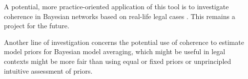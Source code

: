 \documentclass[10pt,]{scrartcl}
\begin{document}
A potential, more practice-oriented  application of this tool is to investigate coherence in  Bayesian networks based on real-life legal cases . This remains a project for the future.

Another line of investigation concerns
the potential use of coherence to    estimate model priors for Bayesian model averaging, which might be useful in legal contexts might be more fair  than using equal or fixed priors or unprincipled intuitive assessment of priors. 






























\end{document}
